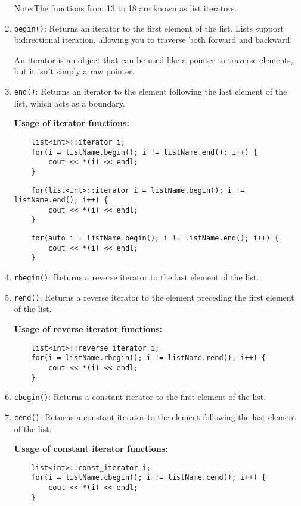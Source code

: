 \documentclass{article}
\begin{document}
\begin{enumerate}
    Note:The functions from 13 to 18 are known as list iterators.

    \item \texttt{begin()}: Returns an iterator to the first element of the list. Lists support bidirectional iteration, allowing you to traverse both forward and backward.
    
    An iterator is an object that can be used like a pointer to traverse elements, but it isn't simply a raw pointer.
    
    \item \texttt{end()}: Returns an iterator to the element following the last element of the list, which acts as a boundary.
    
    \textbf{Usage of iterator functions:}

    \begin{lstlisting}
    list<int>::iterator i;
    for(i = listName.begin(); i != listName.end(); i++) {
        cout << *(i) << endl;
    }
    \end{lstlisting}

    \begin{lstlisting}
    for(list<int>::iterator i = listName.begin(); i != listName.end(); i++) {
        cout << *(i) << endl;
    }
    \end{lstlisting}

    \begin{lstlisting}
    for(auto i = listName.begin(); i != listName.end(); i++) {
        cout << *(i) << endl;
    }
    \end{lstlisting}

    \item \texttt{rbegin()}: Returns a reverse iterator to the last element of the list.
    \item \texttt{rend()}: Returns a reverse iterator to the element preceding the first element of the list.
    
    \textbf{Usage of reverse iterator functions:}

    \begin{lstlisting}
    list<int>::reverse_iterator i;
    for(i = listName.rbegin(); i != listName.rend(); i++) {
        cout << *(i) << endl;
    }
    \end{lstlisting}

    \item \texttt{cbegin()}: Returns a constant iterator to the first element of the list.
    \item \texttt{cend()}: Returns a constant iterator to the element following the last element of the list.
    
    \textbf{Usage of constant iterator functions:}

    \begin{lstlisting}
    list<int>::const_iterator i;
    for(i = listName.cbegin(); i != listName.cend(); i++) {
        cout << *(i) << endl;
    }
    \end{lstlisting}

\end{enumerate}
\end{document}
